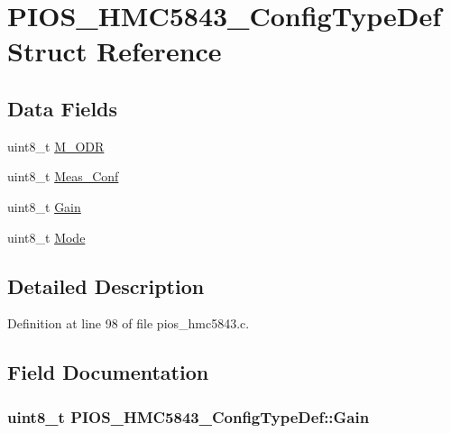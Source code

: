 \hypertarget{struct_p_i_o_s___h_m_c5843___config_type_def}{\section{\-P\-I\-O\-S\-\_\-\-H\-M\-C5843\-\_\-\-Config\-Type\-Def \-Struct \-Reference}
\label{struct_p_i_o_s___h_m_c5843___config_type_def}
}
\subsection*{\-Data \-Fields}
\begin{DoxyCompactItemize}
\item 
uint8\-\_\-t \hyperlink{struct_p_i_o_s___h_m_c5843___config_type_def_a29d80c591af9391d345a4f8ef883f67d}{\-M\-\_\-\-O\-D\-R}
\item 
uint8\-\_\-t \hyperlink{struct_p_i_o_s___h_m_c5843___config_type_def_a6022f43c01ccf2eb427a5b578ed3e77f}{\-Meas\-\_\-\-Conf}
\item 
uint8\-\_\-t \hyperlink{struct_p_i_o_s___h_m_c5843___config_type_def_ad8aff8e30f712fa3c7b73a6d66b96b2f}{\-Gain}
\item 
uint8\-\_\-t \hyperlink{struct_p_i_o_s___h_m_c5843___config_type_def_a333b4ee7245dcb0c5561f1df9fe8e1fd}{\-Mode}
\end{DoxyCompactItemize}


\subsection{\-Detailed \-Description}


\-Definition at line 98 of file pios\-\_\-hmc5843.\-c.



\subsection{\-Field \-Documentation}
\hypertarget{struct_p_i_o_s___h_m_c5843___config_type_def_ad8aff8e30f712fa3c7b73a6d66b96b2f}{
\subsubsection[{\-Gain}]{\setlength{\rightskip}{0pt plus 5cm}uint8\-\_\-t {\bf \-P\-I\-O\-S\-\_\-\-H\-M\-C5843\-\_\-\-Config\-Type\-Def\-::\-Gain}}}\label{struct_p_i_o_s___h_m_c5843___config_type_def_ad8aff8e30f712fa3c7b73a6d66b96b2f}


